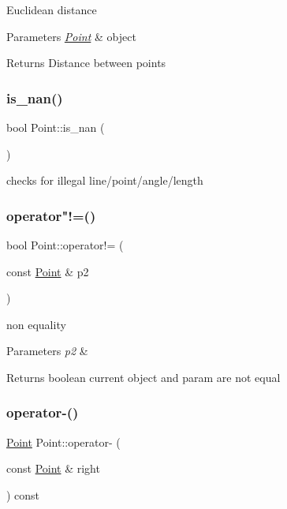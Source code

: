 Euclidean distance 
\begin{DoxyParams}{Parameters}
{\em \mbox{\hyperlink{class_point}{Point}}} & object \\
\hline
\end{DoxyParams}
\begin{DoxyReturn}{Returns}
Distance between points 
\end{DoxyReturn}
\mbox{\label{class_point_a2bc8aed929f6be2b543ba2f26b8a5f72}} 
\subsubsection{\texorpdfstring{is\_nan()}{is\_nan()}}
{\footnotesize\ttfamily bool Point\+::is\+\_\+nan (\begin{DoxyParamCaption}{ }\end{DoxyParamCaption})}

checks for illegal line/point/angle/length \mbox{\label{class_point_ade5f3908ec0e412aea8c3e12f5d0e26f}} 
\subsubsection{\texorpdfstring{operator"!=()}{operator!=()}}
{\footnotesize\ttfamily bool Point\+::operator!= (\begin{DoxyParamCaption}\item[{const \mbox{\hyperlink{class_point}{Point}} \&}]{p2 }\end{DoxyParamCaption})}

non equality 
\begin{DoxyParams}{Parameters}
{\em p2} & \\
\hline
\end{DoxyParams}
\begin{DoxyReturn}{Returns}
boolean current object and param are not equal 
\end{DoxyReturn}
\mbox{\label{class_point_aa3b47f3a3a36f3653f0b1e26dd197257}} 
\subsubsection{\texorpdfstring{operator-\/()}{operator-()}}
{\footnotesize\ttfamily \mbox{\hyperlink{class_point}{Point}} Point\+::operator-\/ (\begin{DoxyParamCaption}\item[{const \mbox{\hyperlink{class_point}{Point}} \&}]{right }\end{DoxyParamCaption}) const}

